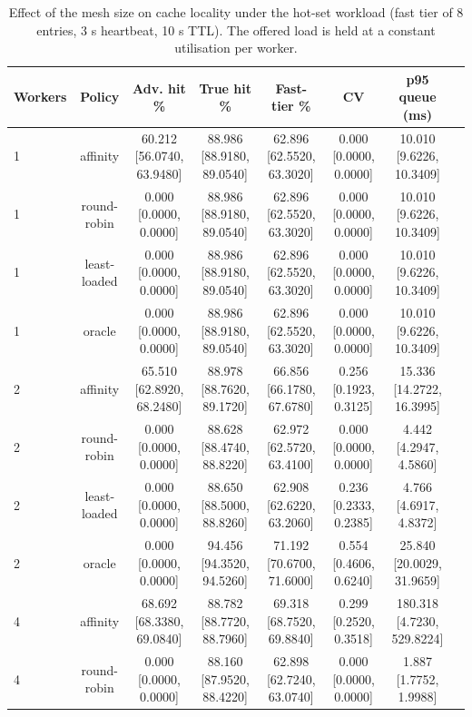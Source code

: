 \begin{table}[t]
\centering
\scriptsize
\setlength{\tabcolsep}{2.5pt}
\caption{Effect of the mesh size on cache locality under the hot-set workload (fast tier of 8 entries, 3 s heartbeat, 10 s TTL). The offered load is held at a constant utilisation per worker.}
\label{tab:worker-scaling}
\begin{tabular}{lccccccc}
\toprule
Workers & Policy & Adv. hit \% & True hit \% & Fast-tier \% & CV & p95 queue (ms) \\
\midrule
1 & affinity & 60.212 \tiny [56.0740, 63.9480] & 88.986 \tiny [88.9180, 89.0540] & 62.896 \tiny [62.5520, 63.3020] & 0.000 \tiny [0.0000, 0.0000] & 10.010 \tiny [9.6226, 10.3409] \\
1 & round-robin & 0.000 \tiny [0.0000, 0.0000] & 88.986 \tiny [88.9180, 89.0540] & 62.896 \tiny [62.5520, 63.3020] & 0.000 \tiny [0.0000, 0.0000] & 10.010 \tiny [9.6226, 10.3409] \\
1 & least-loaded & 0.000 \tiny [0.0000, 0.0000] & 88.986 \tiny [88.9180, 89.0540] & 62.896 \tiny [62.5520, 63.3020] & 0.000 \tiny [0.0000, 0.0000] & 10.010 \tiny [9.6226, 10.3409] \\
1 & oracle & 0.000 \tiny [0.0000, 0.0000] & 88.986 \tiny [88.9180, 89.0540] & 62.896 \tiny [62.5520, 63.3020] & 0.000 \tiny [0.0000, 0.0000] & 10.010 \tiny [9.6226, 10.3409] \\
2 & affinity & 65.510 \tiny [62.8920, 68.2480] & 88.978 \tiny [88.7620, 89.1720] & 66.856 \tiny [66.1780, 67.6780] & 0.256 \tiny [0.1923, 0.3125] & 15.336 \tiny [14.2722, 16.3995] \\
2 & round-robin & 0.000 \tiny [0.0000, 0.0000] & 88.628 \tiny [88.4740, 88.8220] & 62.972 \tiny [62.5720, 63.4100] & 0.000 \tiny [0.0000, 0.0000] & 4.442 \tiny [4.2947, 4.5860] \\
2 & least-loaded & 0.000 \tiny [0.0000, 0.0000] & 88.650 \tiny [88.5000, 88.8260] & 62.908 \tiny [62.6220, 63.2060] & 0.236 \tiny [0.2333, 0.2385] & 4.766 \tiny [4.6917, 4.8372] \\
2 & oracle & 0.000 \tiny [0.0000, 0.0000] & 94.456 \tiny [94.3520, 94.5260] & 71.192 \tiny [70.6700, 71.6000] & 0.554 \tiny [0.4606, 0.6240] & 25.840 \tiny [20.0029, 31.9659] \\
4 & affinity & 68.692 \tiny [68.3380, 69.0840] & 88.782 \tiny [88.7720, 88.7960] & 69.318 \tiny [68.7520, 69.8840] & 0.299 \tiny [0.2520, 0.3518] & 180.318 \tiny [4.7230, 529.8224] \\
4 & round-robin & 0.000 \tiny [0.0000, 0.0000] & 88.160 \tiny [87.9520, 88.4220] & 62.898 \tiny [62.7240, 63.0740] & 0.000 \tiny [0.0000, 0.0000] & 1.887 \tiny [1.7752, 1.9988] \\

\end{tabular}
\end{table}
